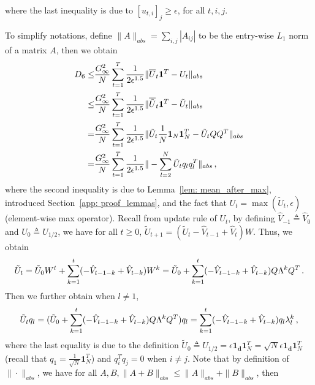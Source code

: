 \documentclass[11pt]{article}
\begin{document}
where the last inequality is due to $[u_{t,i}]_j \geq \epsilon$, for all $t,i,j$.


\newpage

To simplify notations, define $\|A\|_{abs} = \sum_{i,j} |A_{ij}|$ to be the entry-wise $L_1$ norm of a matrix $A$, then we obtain
\begin{align}\notag
D_6 \leq&  \frac{G_{\infty}^2}{N}\sum_{t=1}^T \frac{1}{2\epsilon^{1.5}} \|\overline U_{t} \mathbf{1}^T - U_t \|_{abs} \\\notag
\leq & \frac{G_{\infty}^2}{N}\sum_{t=1}^T \frac{1}{2\epsilon^{1.5}} \|\overline{ \tilde U}_{t} \mathbf{1}^T - \tilde{U}_t \|_{abs} \nonumber  \\
= & \frac{G_{\infty}^2}{N}\sum_{t=1}^T \frac{1}{2\epsilon^{1.5}} \|  \tilde U_{t} \frac{1}{N} \mathbf{1}_N\mathbf{1}_N^T - \tilde U_t Q Q^T \|_{abs}\nonumber   \\
= & \frac{G_{\infty}^2}{N}\sum_{t=1}^T \frac{1}{2\epsilon^{1.5}}  \| - \sum_{l=2}^N   \tilde U_t q_l q_l^T \|_{abs}  \, , \nonumber 
\end{align}
where the second inequality is due to Lemma~\ref{lem: mean_after_max}, introduced Section~\ref{app: proof_lemmas}, and the fact that $U_t = \max(\tilde U_t,\epsilon)$ (element-wise max operator).
Recall from update rule of $U_t$, by defining $\hat V_{-1} \triangleq \hat V_{0}$ and $U_0 \triangleq U_{1/2}$, we have for all $t \geq 0$, $\tilde U_{t+1} = (\tilde U_t  - \hat V_{t-1} + \hat V_{t})W$.
Thus, we obtain
\begin{equation}\notag
\tilde U_{t} = \tilde U_0 W^t + \sum_{k=1}^t (- \hat V_{t-1-k} + \hat V_{t-k} ) W^k =  \tilde U_0 + \sum_{k=1}^t (- \hat V_{t-1-k} + \hat V_{t-k} ) Q \Lambda^k Q^T \, .
\end{equation}
Then we further obtain when $l \neq 1$,
\begin{equation}\notag
\tilde U_t q_l = (\tilde U_0 + \sum_{k=1}^t (- \hat V_{t-1-k} + \hat V_{t-k} ) Q \Lambda^k Q^T) q_l =   \sum_{k=1}^t (- \hat V_{t-1-k} + \hat V_{t-k} ) q_l \lambda_l^k \, ,
\end{equation}
where the last equality is due to the definition $\tilde U_0 \triangleq U_{1/2} =  \epsilon \mathbf{1_d} \mathbf 1_N^T = \sqrt{N}  \epsilon \mathbf{1_d} \mathbf 1_N^T$ (recall that $q_1 = \frac{1}{\sqrt{N}}\mathbf 1_N^T$) and $q_i^T q_j = 0$ when $i \neq j$.
Note that by definition of $\|\cdot \|_{abs}$, we have for all $A, B, \|A+B\|_{abs} \leq \|A\|_{abs} + \|B\|_{abs} $, then
\end{document}
